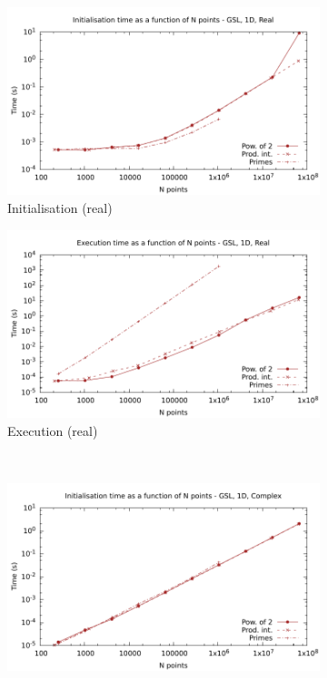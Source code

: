 \documentclass[12pt, a4paper]{article} \setlength{\textheight}{24cm}
\begin{document}
\begin{figure}[htb]
  \captionsetup{width=0.8\linewidth}
  \centering
  \begin{subfigure}{.5\textwidth}
    \centering
    \includegraphics[width=.9\linewidth]{graphs/1d-gsl-init-r.pdf}
    \caption{Initialisation (real)}
    \label{1DGSLRI}
  \end{subfigure}%
  \begin{subfigure}{.5\textwidth}
    \centering
    \includegraphics[width=.9\linewidth]{graphs/1d-gsl-exec-r.pdf}
    \caption{Execution (real)}
    \label{1DGSLR}
  \end{subfigure}\\
  \begin{subfigure}{.5\textwidth}
    \centering
    \includegraphics[width=.9\linewidth]{graphs/1d-gsl-init-c.pdf}

\end{subfigure}
\end{figure}
\end{document}
